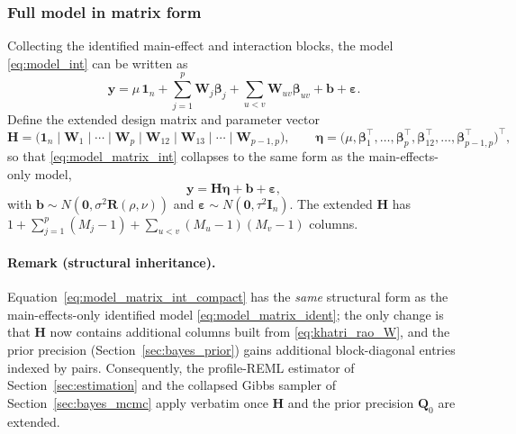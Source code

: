 \subsubsection{Full model in matrix form}\label{sec:int_matrix_form}
Collecting the identified main-effect and interaction blocks, the model \eqref{eq:model_int}
can be written as
\begin{equation}
\boldsymbol y
=\mu\,\mathbf 1_n
+\sum_{j=1}^{p}\mathbf W_j\boldsymbol\beta_j
+\sum_{u<v}\mathbf W_{uv}\boldsymbol\beta_{uv}
+\boldsymbol b+\boldsymbol\varepsilon.
\label{eq:model_matrix_int}
\end{equation}
Define the extended design matrix and parameter vector
\[
\mathbf H=\big(\mathbf 1_n\;\big|\;\mathbf W_1\;\big|\;\cdots\;\big|\;\mathbf W_p\;\big|\;
\mathbf W_{12}\;\big|\;\mathbf W_{13}\;\big|\;\cdots\;\big|\;\mathbf W_{p-1,p}\big),
\qquad
\boldsymbol\eta=\big(\mu,\boldsymbol\beta_1^\top,\ldots,\boldsymbol\beta_p^\top,
\boldsymbol\beta_{12}^\top,\ldots,\boldsymbol\beta_{p-1,p}^\top\big)^\top,
\]
so that \eqref{eq:model_matrix_int} collapses to the same form as the main-effects-only
model,
\begin{equation}
\boldsymbol y=\mathbf H\boldsymbol\eta+\boldsymbol b+\boldsymbol\varepsilon,
\label{eq:model_matrix_int_compact}
\end{equation}
with $\boldsymbol b\sim N(\mathbf 0,\sigma^2\mathbf R(\rho,\nu))$ and
$\boldsymbol\varepsilon\sim N(\mathbf 0,\tau^2\mathbf I_n)$. The extended $\mathbf H$ has
$1+\sum_{j=1}^p(M_j-1)+\sum_{u<v}(M_u-1)(M_v-1)$ columns.

\paragraph{Remark (structural inheritance).}
Equation~\eqref{eq:model_matrix_int_compact} has the \emph{same} structural form as the
main-effects-only identified model \eqref{eq:model_matrix_ident}; the only change is that
$\mathbf H$ now contains additional columns built from \eqref{eq:khatri_rao_W}, and the
prior precision (Section~\ref{sec:bayes_prior}) gains additional block-diagonal entries
indexed by pairs. Consequently, the profile-REML estimator of
Section~\ref{sec:estimation} and the collapsed Gibbs sampler of
Section~\ref{sec:bayes_mcmc} apply verbatim once $\mathbf H$ and the prior precision
$\mathbf Q_0$ are extended.
